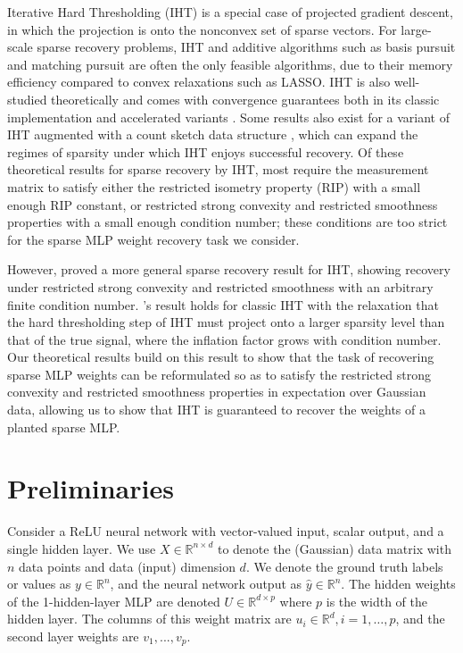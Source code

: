 \documentclass{article} %
\newcommand{\measurement}{y}
\newcommand{\n}{\ensuremath{n}}
\newcommand{\p}{\ensuremath{p}}
\newcommand{\datadim}{\ensuremath{d}}
\newcommand{\X}{\ensuremath{X}}
\newcommand{\1}{\ensuremath{{\sf (i)}}}
\newcommand{\2}{\ensuremath{{\sf (ii)}}}
\newcommand{\3}{\ensuremath{{\sf (iii)}}}
\newcommand{\4}{\ensuremath{{\sf (iv)}}}
\newcommand{\5}{\ensuremath{{\sf (v)}}}
\newcommand{\6}{\ensuremath{{\sf (vi)}}}
\newcommand{\R}{\mathbb{R}}
\begin{document}
Iterative Hard Thresholding (IHT) is a special case of projected gradient descent, in which the projection is onto the nonconvex set of sparse vectors. For large-scale sparse recovery problems, IHT and additive algorithms such as basis pursuit and matching pursuit \citep{tropp2004greed} are often the only feasible algorithms, due to their memory efficiency compared to convex relaxations such as LASSO. IHT is also well-studied theoretically and comes with convergence guarantees both in its classic implementation \citep{blumensath2009iterative, blumensath2010normalized, jain2014iterative} and accelerated variants \citep{blumensath2012accelerated, khanna2018iht}. Some results also exist for a variant of IHT augmented with a count sketch data structure \citep{aghazadeh2018mission}, which can expand the regimes of sparsity under which IHT enjoys successful recovery. Of these theoretical results for sparse recovery by IHT, most require the measurement matrix to satisfy either the restricted isometry property (RIP) with a small enough RIP constant, or restricted strong convexity and restricted smoothness properties with a small enough condition number; these conditions are too strict for the sparse MLP weight recovery task we consider. 

However, \citet{jain2014iterative} proved a more general sparse recovery result for IHT, showing recovery under restricted strong convexity and restricted smoothness with an arbitrary finite condition number. \citet{jain2014iterative}'s result holds for classic IHT with the relaxation that the hard thresholding step of IHT must project onto a larger sparsity level than that of the true signal, where the inflation factor grows with condition number. Our theoretical results build on this result to show that the task of recovering sparse MLP weights can be reformulated so as to satisfy the restricted strong convexity and restricted smoothness properties in expectation over Gaussian data, allowing us to show that IHT is guaranteed to recover the weights of a planted sparse MLP.




\section{Preliminaries}
\label{sec:preliminaries}

Consider a ReLU neural network with vector-valued input, scalar output, and a single hidden layer. We use $\X \in \R^{\n \times \datadim}$ to denote the (Gaussian) data matrix with $\n$ data points and data (input) dimension $\datadim$. We denote the ground truth labels or values as $\measurement \in \R^\n$, and the neural network output as $\hat\measurement \in \R^\n$. The hidden weights of the 1-hidden-layer MLP are denoted $U \in \R^{\datadim \times \p}$ where $\p$ is the width of the hidden layer. The columns of this weight matrix are $u_i \in \R^\datadim, i=1,\dots,\p$, and the second layer weights are $v_1,...,v_p$.
\end{document}
